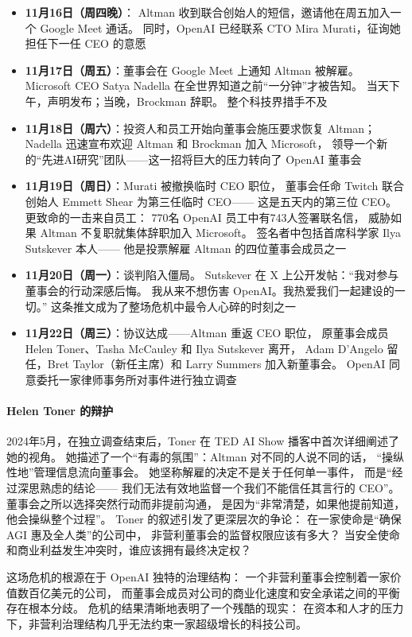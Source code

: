 \begin{whybox}
\begin{itemize}[noitemsep]
  \item \textbf{11月16日（周四晚）}：
        Altman 收到联合创始人的短信，邀请他在周五加入一个 Google Meet 通话。
        同时，OpenAI 已经联系 CTO Mira Murati，征询她担任下一任 CEO 的意愿
  \item \textbf{11月17日（周五）}：董事会在 Google Meet 上通知 Altman 被解雇。
        Microsoft CEO Satya Nadella 在全世界知道之前``一分钟''才被告知。
        当天下午，声明发布；当晚，Brockman 辞职。
        整个科技界措手不及
  \item \textbf{11月18日（周六）}：投资人和员工开始向董事会施压要求恢复 Altman；
        Nadella 迅速宣布欢迎 Altman 和 Brockman 加入 Microsoft，
        领导一个新的``先进AI研究''团队——这一招将巨大的压力转向了 OpenAI 董事会
  \item \textbf{11月19日（周日）}：Murati 被撤换临时 CEO 职位，
        董事会任命 Twitch 联合创始人 Emmett Shear 为第三任临时 CEO——
        这是五天内的第三位 CEO。
        更致命的一击来自员工：
        770名 OpenAI 员工中有743人签署联名信，
        威胁如果 Altman 不复职就集体辞职加入 Microsoft。
        签名者中包括首席科学家 Ilya Sutskever 本人——
        他是投票解雇 Altman 的四位董事会成员之一
  \item \textbf{11月20日（周一）}：谈判陷入僵局。
        Sutskever 在 X 上公开发帖：``我对参与董事会的行动深感后悔。
        我从来不想伤害 OpenAI。我热爱我们一起建设的一切。''
        这条推文成为了整场危机中最令人心碎的时刻之一
  \item \textbf{11月22日（周三）}：协议达成——Altman 重返 CEO 职位，
        原董事会成员 Helen Toner、Tasha McCauley 和 Ilya Sutskever 离开，
        Adam D'Angelo 留任，Bret Taylor（新任主席）和 Larry Summers 加入新董事会。
        OpenAI 同意委托一家律师事务所对事件进行独立调查
\end{itemize}

\paragraph{Helen Toner 的辩护}
2024年5月，在独立调查结束后，Toner 在 TED AI Show 播客中首次详细阐述了她的视角。
她描述了一个``有毒的氛围''：Altman 对不同的人说不同的话，
``操纵性地''管理信息流向董事会。
她坚称解雇的决定不是关于任何单一事件，
而是``经过深思熟虑的结论——
我们无法有效地监督一个我们不能信任其言行的 CEO''。
董事会之所以选择突然行动而非提前沟通，
是因为``非常清楚，如果他提前知道，他会操纵整个过程''。
Toner 的叙述引发了更深层次的争论：
在一家使命是``确保 AGI 惠及全人类''的公司中，
非营利董事会的监督权限应该有多大？
当安全使命和商业利益发生冲突时，谁应该拥有最终决定权？

这场危机的根源在于 OpenAI 独特的治理结构：
一个非营利董事会控制着一家价值数百亿美元的公司，
而董事会成员对公司的商业化速度和安全承诺之间的平衡存在根本分歧。
危机的结果清晰地表明了一个残酷的现实：
在资本和人才的压力下，非营利治理结构几乎无法约束一家超级增长的科技公司。
\end{whybox}

